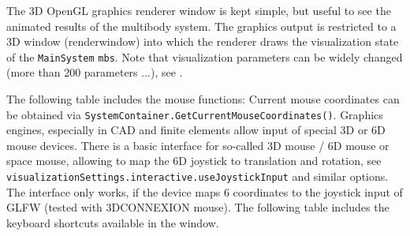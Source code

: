 %
%
The 3D OpenGL graphics renderer window is kept simple, but useful to see the animated results of the multibody system.
The graphics output is restricted to a 3D window (renderwindow) into which the renderer draws the visualization state of the \texttt{MainSystem} \texttt{mbs}.
Note that visualization parameters can be widely changed (more than 200 parameters ...), see .


The following table includes the mouse functions:
%
\finishTable
%
Current mouse coordinates can be obtained via \texttt{SystemContainer.GetCurrentMouseCoordinates()}.
%
Graphics engines, especially in CAD and finite elements allow input of special 3D or 6D mouse devices.
There is a basic interface for so-called 3D mouse / 6D mouse or space mouse, allowing to map the 6D joystick to translation and rotation,
see \texttt{visualizationSettings.interactive.useJoystickInput} and similar options.
The interface only works, if the device maps 6 coordinates to the joystick input of GLFW (tested with 3DCONNEXION mouse).
The following table includes the keyboard shortcuts available in the window. 

